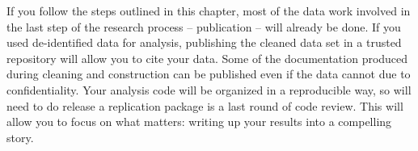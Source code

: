 If you follow the steps outlined in this chapter,
most of the data work involved in the last step of the research process
-- publication -- will already be done.
If you used de-identified data for analysis,
publishing the cleaned data set in a trusted repository will allow you to cite your data.
Some of the documentation produced during cleaning and construction can be published
even if the data cannot due to confidentiality.
Your analysis code will be organized in a reproducible way,
so will need to do release a replication package is a last round of code review.
This will allow you to focus on what matters:
writing up your results into a compelling story.

